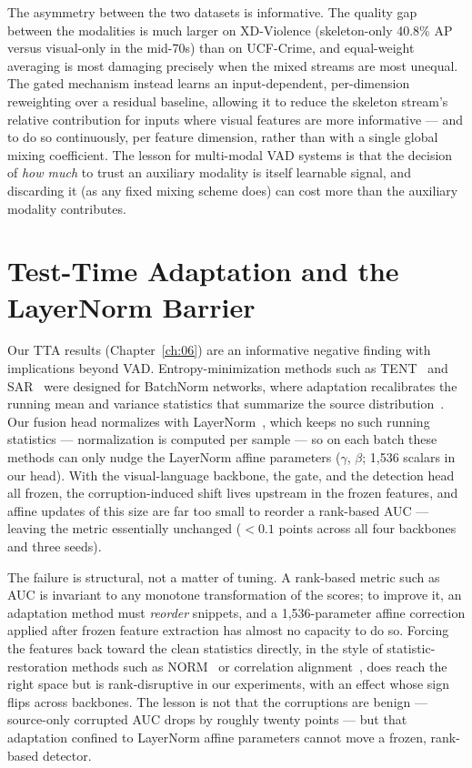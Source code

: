 The asymmetry between the two datasets is informative. The quality gap between
the modalities is much larger on XD-Violence (skeleton-only 40.8\% AP versus
visual-only in the mid-70s) than on UCF-Crime, and equal-weight averaging is
most damaging precisely when the mixed streams are most unequal. The gated
mechanism instead learns an input-dependent, per-dimension reweighting over a
residual baseline, allowing it to reduce the skeleton stream's relative
contribution for inputs where visual features are more informative --- and to
do so continuously, per feature dimension, rather than with a single global
mixing coefficient. The lesson for multi-modal VAD systems is that the
decision of \emph{how much} to trust an auxiliary modality is itself learnable
signal, and discarding it (as any fixed mixing scheme does) can cost more than
the auxiliary modality contributes.

\section{Test-Time Adaptation and the LayerNorm Barrier}
\label{sec:disc-ln-barrier}

Our TTA results (Chapter~\ref{ch:06}) are an informative negative finding with
implications beyond VAD. Entropy-minimization methods such as
TENT~\cite{wang2021tent} and SAR~\cite{niu2023sar} were designed for BatchNorm
networks, where adaptation recalibrates the running mean and variance
statistics that summarize the source distribution~\cite{ioffe2015batchnorm}.
Our fusion head normalizes with LayerNorm~\cite{ba2016layernorm}, which keeps
no such running statistics --- normalization is computed per sample --- so on
each batch these methods can only nudge the LayerNorm affine parameters
($\gamma$, $\beta$; 1{,}536 scalars in our head). With the visual-language
backbone, the gate, and the detection head all frozen, the corruption-induced
shift lives upstream in the frozen features, and affine updates of this size
are far too small to reorder a rank-based AUC --- leaving the metric
essentially unchanged ($<0.1$ points across all four backbones and three
seeds).

The failure is structural, not a matter of tuning. A rank-based metric such as
AUC is invariant to any monotone transformation of the scores; to improve it,
an adaptation method must \emph{reorder} snippets, and a 1,536-parameter
affine correction applied after frozen feature extraction has almost no
capacity to do so. Forcing the features back toward the clean statistics
directly, in the style of statistic-restoration methods such as
NORM~\cite{schneider2020norm} or correlation alignment~\cite{sun2016coral},
does reach the right space but is rank-disruptive in our experiments, with an
effect whose sign flips across backbones. The lesson is not that the
corruptions are benign --- source-only corrupted AUC drops by roughly twenty
points --- but that adaptation confined to LayerNorm affine parameters cannot
move a frozen, rank-based detector.

